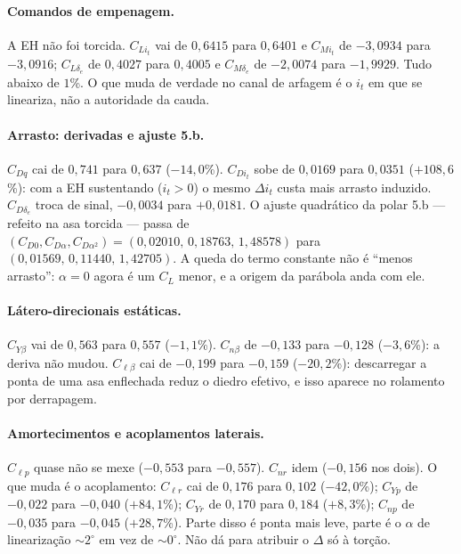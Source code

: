 \paragraph{Comandos de empenagem.}
A EH não foi torcida. $C_{Li_t}$ vai de $0{,}6415$ para $0{,}6401$ e
$C_{Mi_t}$ de $-3{,}0934$ para $-3{,}0916$; $C_{L\delta_e}$ de $0{,}4027$
para $0{,}4005$ e $C_{M\delta_e}$ de $-2{,}0074$ para $-1{,}9929$. Tudo
abaixo de $1$\%. O que muda de verdade no canal de arfagem é o $i_t$ em que
se lineariza, não a autoridade da cauda.

\paragraph{Arrasto: derivadas e ajuste 5.b.}
$C_{Dq}$ cai de $0{,}741$ para $0{,}637$ ($-14{,}0$\%). $C_{Di_t}$ sobe de
$0{,}0169$ para $0{,}0351$ ($+108{,}6$\%): com a EH sustentando ($i_t>0$) o
mesmo $\Delta i_t$ custa mais arrasto induzido. $C_{D\delta_e}$ troca de
sinal, $-0{,}0034$ para $+0{,}0181$. O ajuste quadrático da polar 5.b ---
refeito na asa torcida --- passa de
$(C_{D0},C_{D\alpha},C_{D\alpha^2})=(0{,}02010,\,0{,}18763,\,1{,}48578)$
para $(0{,}01569,\,0{,}11440,\,1{,}42705)$. A queda do termo constante não
é ``menos arrasto'': $\alpha=0$ agora é um $C_L$ menor, e a origem da
parábola anda com ele.

\paragraph{Látero-direcionais estáticas.}
$C_{Y\beta}$ vai de $0{,}563$ para $0{,}557$ ($-1{,}1$\%). $C_{n\beta}$ de
$-0{,}133$ para $-0{,}128$ ($-3{,}6$\%): a deriva não mudou.
$C_{\ell\beta}$ cai de $-0{,}199$ para $-0{,}159$ ($-20{,}2$\%):
descarregar a ponta de uma asa enflechada reduz o diedro efetivo, e isso
aparece no rolamento por derrapagem.

\paragraph{Amortecimentos e acoplamentos laterais.}
$C_{\ell p}$ quase não se mexe ($-0{,}553$ para $-0{,}557$). $C_{nr}$ idem
($-0{,}156$ nos dois). O que muda é o acoplamento: $C_{\ell r}$ cai de
$0{,}176$ para $0{,}102$ ($-42{,}0$\%); $C_{Yp}$ de $-0{,}022$ para
$-0{,}040$ ($+84{,}1$\%); $C_{Yr}$ de $0{,}170$ para $0{,}184$
($+8{,}3$\%); $C_{np}$ de $-0{,}035$ para $-0{,}045$ ($+28{,}7$\%). Parte
disso é ponta mais leve, parte é o $\alpha$ de linearização $\sim 2^\circ$
em vez de $\sim 0^\circ$. Não dá para atribuir o $\Delta$ só à torção.

